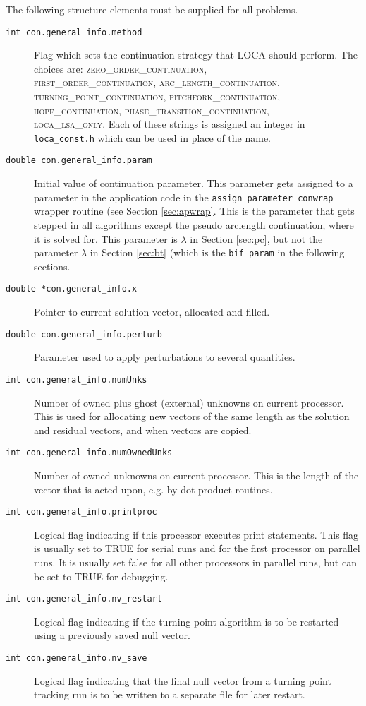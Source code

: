 The following structure elements must be supplied for all problems. 

\begin{description}
\item[\texttt{int con.general\_info.method}] Flag which sets the continuation strategy that LOCA should perform. The choices are: \textsc{zero\_order\_continuation, \\ first\_order\_continuation, arc\_length\_continuation, \\ turning\_point\_continuation, pitchfork\_continuation, \\
hopf\_continuation, phase\_transition\_continuation, \\ loca\_lsa\_only.} Each of these strings is assigned an integer in \texttt{loca\_const.h} which can be used in place of the name.
\item[\texttt{double con.general\_info.param}] Initial value of continuation parameter. This parameter gets assigned to a parameter in the application code in the \texttt{assign\_parameter\_conwrap} wrapper routine (see Section \ref{sec:apwrap}. This is the parameter that gets stepped in all algorithms except the pseudo arclength continuation, where it is solved for. This parameter is $\lambda$ in Section \ref{sec:pc}, but not the parameter $\lambda$ in Section \ref{sec:bt} (which is the \texttt{bif\_param} in the following sections. 
\item[\texttt{double *con.general\_info.x}] Pointer to current solution vector, allocated and filled.
\item[\texttt{double con.general\_info.perturb}] Parameter used to apply perturbations to several quantities.
\item[\texttt{int con.general\_info.numUnks}] Number of owned plus ghost (external) unknowns on current processor. This is used for allocating new vectors of the same length as the solution and residual vectors, and when vectors are copied.
\item[\texttt{int con.general\_info.numOwnedUnks}] Number of owned unknowns on current processor. This is the length of the vector that is acted upon, e.g. by dot product routines.
\item[\texttt{int con.general\_info.printproc}] Logical flag indicating if this processor executes print statements. This flag is usually set to TRUE for serial runs and for the first processor on parallel runs. It is usually set false for all other processors in parallel runs, but can be set to TRUE for debugging.
\item[\texttt{int con.general\_info.nv\_restart}] Logical flag indicating if the turning point algorithm is to be restarted using a previously saved null vector.
\item[\texttt{int con.general\_info.nv\_save}] Logical flag indicating that the final null vector from a turning point tracking run is to be written to a separate file for later restart.
\end{description}

